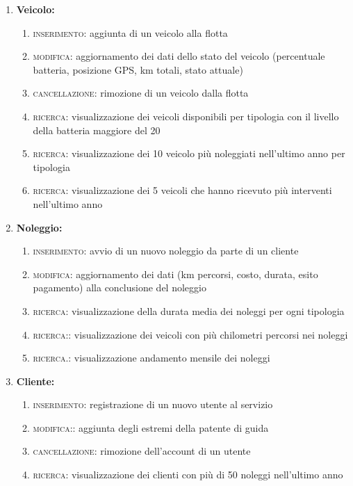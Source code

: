 \documentclass{article}
\begin{document}
\begin{enumerate}
    \item \textbf{Veicolo:} 
    \begin{enumerate}
        \item \textsc{inserimento:} aggiunta di un veicolo alla flotta
        \item \textsc{modifica:} aggiornamento dei dati dello stato del veicolo (percentuale batteria, posizione GPS, km totali, stato attuale)
        \item \textsc{cancellazione:} rimozione di un veicolo dalla flotta
        \item \textsc{ricerca:} visualizzazione dei veicoli disponibili per tipologia con il livello della batteria maggiore del 20%
        \item \textsc{ricerca:} visualizzazione dei 10 veicolo più noleggiati nell'ultimo anno per tipologia
        \item \textsc{ricerca}: visualizzazione dei 5 veicoli che hanno ricevuto più interventi nell'ultimo anno
    \end{enumerate}
    \item \textbf{Noleggio:}
    \begin{enumerate}
        \item \textsc{inserimento:} avvio di un nuovo noleggio da parte di un cliente
        \item \textsc{modifica:} aggiornamento dei dati (km percorsi, costo, durata, esito pagamento) alla conclusione del noleggio
        \item \textsc{ricerca:} visualizzazione della durata media dei noleggi per ogni tipologia
        \item \textsc{ricerca:}: visualizzazione dei veicoli con più chilometri percorsi nei noleggi
        \item \textsc{ricerca.}: visualizzazione andamento mensile dei noleggi
    \end{enumerate}
    \item \textbf{Cliente:}
    \begin{enumerate}
        \item \textsc{inserimento:} registrazione di un nuovo utente al servizio
        \item \textsc{modifica:}: aggiunta degli estremi della patente di guida
        \item \textsc{cancellazione:} rimozione dell'account di un utente
        \item \textsc{ricerca:} visualizzazione dei clienti con più di 50 noleggi nell'ultimo anno

\end{enumerate}
\end{enumerate}
\end{document}
